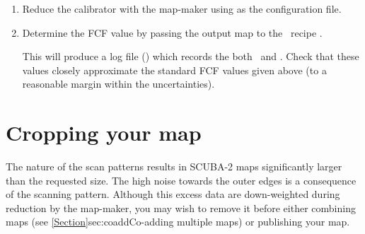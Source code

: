 \begin{enumerate}
\item Reduce the calibrator with the map-maker using
   as the configuration file.

\item Determine the FCF value by passing the output map to the
  \picard\ recipe
  .

\begin{terminalv}
\end{terminalv}

This will produce a log file () which records the
both \fcfb\ and \fcfa. Check that these values closely approximate the
standard FCF values given above (to a reasonable margin within the
uncertainties).




\end{enumerate}


\section{Cropping your map}
\label{sec:crop}

The nature of the scan patterns results in SCUBA-2 maps significantly
larger than the requested size. The high noise towards the outer edges
is a consequence of the scanning pattern. Although this excess data
are down-weighted during reduction by the map-maker, you may wish to
remove it before either combining maps (see
\cref{Section}{sec:coadd}{Co-adding multiple maps}) or publishing your
map.

